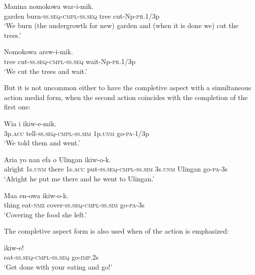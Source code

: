 \ea%
\label{ex:3:x1041}
\gll Manina  nomokowa war-i-mik. \\
garden burn-\textsc{ss}.\textsc{seq}-\textsc{cmpl}-\textsc{ss}.\textsc{seq} tree cut-Np-\textsc{pr}.1/3p\\
\glt`We burn (the undergrowth for new) garden and (when it is done we) cut the trees.'
\z

\ea%
\label{ex:3:x1042}
\gll Nomokowa  arew-i-mik. \\
tree cut-\textsc{ss}.\textsc{seq}-\textsc{cmpl}-\textsc{ss}.\textsc{seq} wait-Np-\textsc{pr}.1/3p\\
\glt`We cut the trees and wait.'
\z

But it is not uncommon either to have the completive aspect with a simultaneous action medial form, when the second action coincides with the completion of the first one:

\ea%
\label{ex:3:x363}
\gll Wia  i ikiw-e-mik. \\
3p.\textsc{acc} tell-\textsc{ss}.\textsc{seq}-\textsc{cmpl}-\textsc{ss}.\textsc{sim} 1p.\textsc{unm} go-\textsc{pa}-1/3p\\
\glt`We told them and went.' 
\z

\ea%
\label{ex:3:x1040}
\gll Aria yo nan efa  o Ulingan ikiw-o-k.\\
alright 1s.\textsc{unm} there 1s.\textsc{acc} put-\textsc{ss}.\textsc{seq}-\textsc{cmpl}-\textsc{ss}.\textsc{sim} 3s.\textsc{unm} Ulingan go-\textsc{pa}-3s\\
\glt`Alright he put me there and he went to Ulingan.'
\z

\ea%
\label{ex:3:x1043}
\gll Maa en-owa  ikiw-o-k. \\
thing eat-\textsc{nmz} cover-\textsc{ss}.\textsc{seq}-\textsc{cmpl}-\textsc{ss}.\textsc{sim} go-\textsc{pa}-3s\\
\glt`Covering the food she left.'
\z

The completive aspect form is also used when  of the action is emphasized:

\ea%
\label{ex:3:x364}
\gll {} ikiw-e! \\
eat-\textsc{ss}.\textsc{seq}-\textsc{cmpl}-\textsc{ss}.\textsc{seq} go-\textsc{imp}.2s\\
\glt`Get done with your eating and go!'
\z

